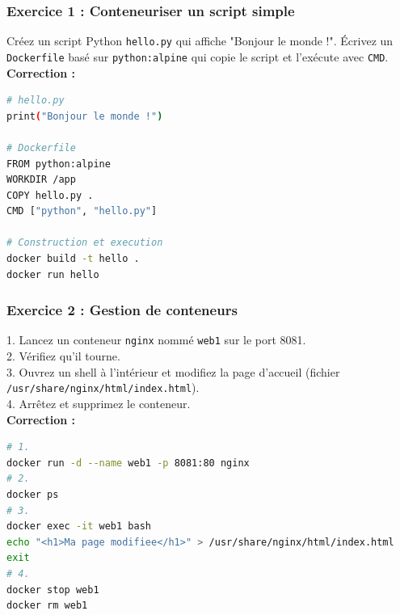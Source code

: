 \documentclass[a4paper,12pt]{article}
\begin{document}
\subsubsection{Exercice 1 : Conteneuriser un script simple}
Créez un script Python \texttt{hello.py} qui affiche "Bonjour le monde !". Écrivez un \texttt{Dockerfile} basé sur \texttt{python:alpine} qui copie le script et l'exécute avec \texttt{CMD}.
\\[0.5cm]
\textbf{Correction :}
\begin{lstlisting}[language=bash]
# hello.py
print("Bonjour le monde !")

# Dockerfile
FROM python:alpine
WORKDIR /app
COPY hello.py .
CMD ["python", "hello.py"]

# Construction et execution
docker build -t hello .
docker run hello
\end{lstlisting}

\subsubsection{Exercice 2 : Gestion de conteneurs}
1. Lancez un conteneur \texttt{nginx} nommé \texttt{web1} sur le port 8081. \\
2. Vérifiez qu'il tourne. \\
3. Ouvrez un shell à l'intérieur et modifiez la page d'accueil (fichier \texttt{/usr/share/nginx/html/index.html}). \\
4. Arrêtez et supprimez le conteneur.
\\[0.5cm]
\textbf{Correction :}
\begin{lstlisting}[language=bash]
# 1.
docker run -d --name web1 -p 8081:80 nginx
# 2.
docker ps
# 3.
docker exec -it web1 bash
echo "<h1>Ma page modifiee</h1>" > /usr/share/nginx/html/index.html
exit
# 4.
docker stop web1
docker rm web1
\end{lstlisting}
\end{document}
